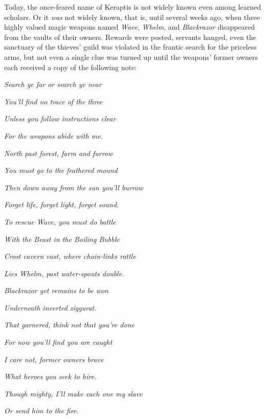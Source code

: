 \documentclass[10pt,a4paper,twoside,bg=print,twocolumn,openany,nodeprecatedcode]{dndbook}
\begin{document}
Today, the once-feared name of Keraptis is not widely known even among learned scholars. Or it \textit{was} not widely known, that is, until several weeks ago, when three highly valued magic weapons named \textit{Wave}, \textit{Whelm}, and \textit{Blackrazor} disappeared from the vaults of their owners. Rewards were posted, servants hanged, even the sanctuary of the thieves' guild was violated in the frantic search for the priceless arms, but not even a single clue was turned up until the weapons' former owners each received a copy of the following note:

\begin{DndSidebar}[float=!b]{}
\textit{Search ye far or search ye near}



\textit{You'll find no trace of the three}



\textit{Unless you follow instructions clear}



\textit{For the weapons abide with me.}



\textit{North past forest, farm and furrow}



\textit{You must go to the feathered mound}



\textit{Then down away from the sun you'll burrow}



\textit{Forget life, forget light, forget sound.}



\textit{To rescue Wave, you must do battle}



\textit{With the Beast in the Boiling Bubble}



\textit{Crost cavern vast, where chain-links rattle}



\textit{Lies Whelm, past water-spouts double.}



\textit{Blackrazor yet remains to be won}



\textit{Underneath inverted ziggurat}.



\textit{That garnered, think not that you're done}



\textit{For now you'll find you are caught}



\textit{I care not, former owners brave}



\textit{What heroes you seek to hire.}



\textit{Though mighty, I'll make each one my slave}



\textit{Or send him to the fire.}



\end{DndSidebar}
\end{document}
